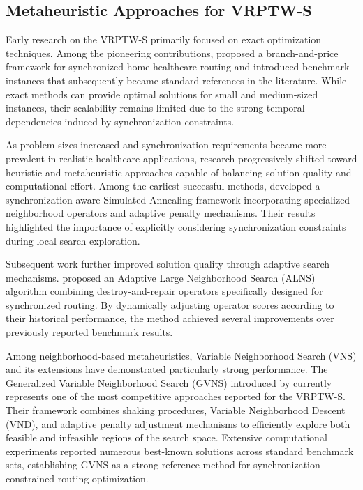 \subsection{Metaheuristic Approaches for VRPTW-S}
Early research on the VRPTW-S primarily focused on exact optimization techniques. Among the pioneering contributions, \citet{bredstrom2008combined} proposed a branch-and-price framework for synchronized home healthcare routing and introduced benchmark instances that subsequently became standard references in the literature. While exact methods can provide optimal solutions for small and medium-sized instances, their scalability remains limited due to the strong temporal dependencies induced by synchronization constraints.

As problem sizes increased and synchronization requirements became more prevalent in realistic healthcare applications, research progressively shifted toward heuristic and metaheuristic approaches capable of balancing solution quality and computational effort. Among the earliest successful methods, \citet{afifi2016heuristic} developed a synchronization-aware Simulated Annealing framework incorporating specialized neighborhood operators and adaptive penalty mechanisms. Their results highlighted the importance of explicitly considering synchronization constraints during local search exploration.

Subsequent work further improved solution quality through adaptive search mechanisms. \citet{liu2019adaptive} proposed an Adaptive Large Neighborhood Search (ALNS) algorithm combining destroy-and-repair operators specifically designed for synchronized routing. By dynamically adjusting operator scores according to their historical performance, the method achieved several improvements over previously reported benchmark results.

Among neighborhood-based metaheuristics, Variable Neighborhood Search (VNS) and its extensions have demonstrated particularly strong performance. The Generalized Variable Neighborhood Search (GVNS) introduced by \citet{masmoudi2025generalized} currently represents one of the most competitive approaches reported for the VRPTW-S. Their framework combines shaking procedures, Variable Neighborhood Descent (VND), and adaptive penalty adjustment mechanisms to efficiently explore both feasible and infeasible regions of the search space. Extensive computational experiments reported numerous best-known solutions across standard benchmark sets, establishing GVNS as a strong reference method for synchronization-constrained routing optimization.


